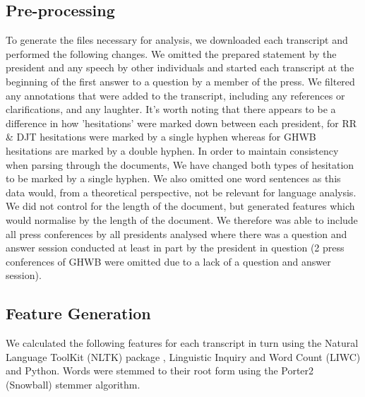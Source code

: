\documentclass[12pt]{article}
\begin{document}
\subsection{Pre-processing}
To generate the files necessary for analysis, we downloaded each transcript and performed the following changes. We omitted the prepared statement by the president and any speech by other individuals and started each transcript at the beginning of the first answer to a question by a member of the press. We filtered any annotations that were added to the transcript, including any references or clarifications, and any laughter. It's worth noting that there appears to be a difference in how 'hesitations' were marked down between each president, for RR \& DJT hesitations were marked by a single hyphen whereas for GHWB hesitations are marked by a double hyphen. In order to maintain consistency when parsing through the documents, We have changed both types of hesitation to be marked by a single hyphen. We also omitted one word sentences as this data would, from a theoretical perspective, not be relevant for language analysis. We did not control for the length of the document, but generated features which would normalise by the length of the document. We therefore was able to include all press conferences by all presidents analysed where there was a question and answer session conducted at least in part by the president in question (2 press conferences of GHWB were omitted due to a lack of a question and answer session).

\subsection{Feature Generation}
We calculated the following features for each transcript in turn using the Natural Language ToolKit (NLTK) package \cite{Bird2009}, Linguistic Inquiry and Word Count (LIWC) \cite{Pennebaker2015} and Python. Words were stemmed to their root form using the Porter2 (Snowball) stemmer algorithm. 
\par 
\end{document}
